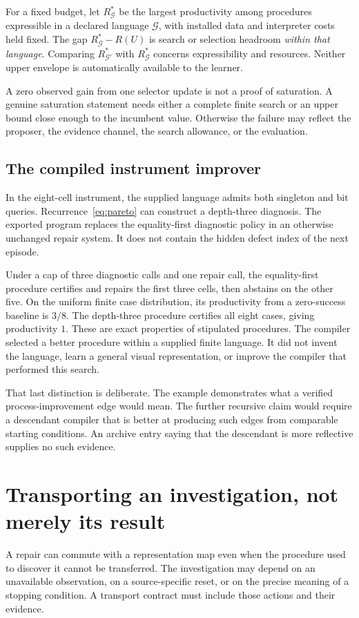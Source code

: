 \documentclass[11pt,letterpaper]{article}
\theoremstyle{plain}
\theoremstyle{definition}
\begin{document}
For a fixed budget, let $R^*_{\mathcal G}$ be the largest productivity among procedures expressible in a declared language $\mathcal G$, with installed data and interpreter costs held fixed. The gap $R^*_{\mathcal G}-R(U)$ is search or selection headroom \emph{within that language}. Comparing $R^*_{\mathcal G'}$ with $R^*_{\mathcal G}$ concerns expressibility and resources. Neither upper envelope is automatically available to the learner.

A zero observed gain from one selector update is not a proof of saturation. A genuine saturation statement needs either a complete finite search or an upper bound close enough to the incumbent value. Otherwise the failure may reflect the proposer, the evidence channel, the search allowance, or the evaluation.

\subsection{The compiled instrument improver}
In the eight-cell instrument, the supplied language admits both singleton and bit queries. Recurrence~\eqref{eq:pareto} can construct a depth-three diagnosis. The exported program replaces the equality-first diagnostic policy in an otherwise unchanged repair system. It does not contain the hidden defect index of the next episode.

Under a cap of three diagnostic calls and one repair call, the equality-first procedure certifies and repairs the first three cells, then abstains on the other five. On the uniform finite case distribution, its productivity from a zero-success baseline is $3/8$. The depth-three procedure certifies all eight cases, giving productivity $1$. These are exact properties of stipulated procedures. The compiler selected a better procedure within a supplied finite language. It did not invent the language, learn a general visual representation, or improve the compiler that performed this search.

That last distinction is deliberate. The example demonstrates what a verified process-improvement edge would mean. The further recursive claim would require a descendant compiler that is better at producing such edges from comparable starting conditions. An archive entry saying that the descendant is more reflective supplies no such evidence.

\section{Transporting an investigation, not merely its result}\label{sec:transport}
A repair can commute with a representation map even when the procedure used to discover it cannot be transferred. The investigation may depend on an unavailable observation, on a source-specific reset, or on the precise meaning of a stopping condition. A transport contract must include those actions and their evidence.
\end{document}
